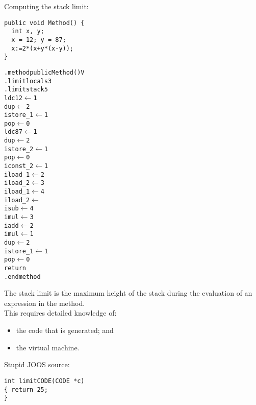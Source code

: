 \begin{slide*}
Computing the stack limit:

\begin{scriptsize}
\begin{verbatim}
public void Method() {
  int x, y;
  x = 12; y = 87;
  x:=2*(x+y*(x-y));
}
\end{verbatim}
\end{scriptsize}

\newcommand{\LA}{$\leftarrow$}
\newcommand{\zap}{\hspace*{-0.415em}}
\begin{scriptsize}
\begin{alltt}
.method public Method()V
  .limit locals 3
  .limit stack 5
  ldc 12       \LA{} 1
  dup          \LA{} 2
  istore_1     \LA{} 1
  pop          \LA{} 0
  ldc 87       \LA{} 1
  dup          \LA{} 2
  istore_2     \LA{} 1
  pop          \LA{} 0
  iconst_2     \LA{} 1
  iload_1      \LA{} 2
  iload_2      \LA{} 3
  iload_1      \LA{} 4
  iload_2      \LA{} \zap{}
  isub         \LA{} 4
  imul         \LA{} 3
  iadd         \LA{} 2
  imul         \LA{} 1
  dup          \LA{} 2
  istore_1     \LA{} 1
  pop          \LA{} 0
  return
.end method
\end{alltt}
\end{scriptsize}
\vfil
\end{slide*}

\begin{slide*}
The stack limit 
is the maximum height of the stack during the evaluation of an expression 
in the method.\\

This requires detailed knowledge of:
\begin{itemize}
\item the code that is generated; and
\item the virtual machine.
\end{itemize}
\vspace*{2ex}

Stupid  JOOS source:
\begin{verbatim}
int limitCODE(CODE *c)
{ return 25;
}
\end{verbatim}

\vfil
\end{slide*}

